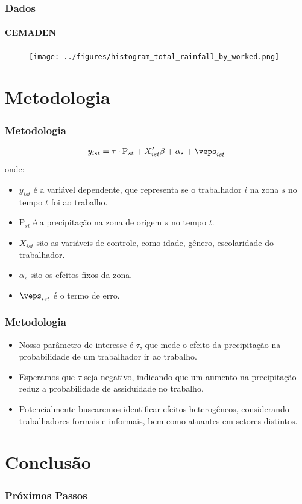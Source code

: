 \begin{frame}[plain]
    \frametitle{Dados}
    \framesubtitle{CEMADEN}
    \begin{figure}[H]
        \centering
        \texttt{[image: ../figures/histogram\_total\_rainfall\_by\_worked.png]}
        \label{fig:hist_total_rainfall_by_worked}
    \end{figure} 
\end{frame}


\section{Metodologia}
\begin{frame}[plain]
    \frametitle{Metodologia}
    \begin{align*}
    y_{ist} &= \tau \cdot \text{P}_{st} + X_{ist}'\beta + \alpha_{s} + \veps_{ist} \\ 
    \end{align*}
    onde:
    \begin{itemize}
        \item $y_{ist}$ é a variável dependente, que representa se o trabalhador $i$ na zona $s$ no tempo $t$ foi ao trabalho.
        \item $\text{P}_{st}$ é a precipitação na zona de origem $s$ no tempo $t$.
        \item $X_{ist}$ são as variáveis de controle, como idade, gênero, escolaridade do trabalhador.
        \item $\alpha_{s}$ são os efeitos fixos da zona.
        \item $\veps_{ist}$ é o termo de erro.
    \end{itemize}
\end{frame}

\begin{frame}
    \frametitle{Metodologia}
    \begin{itemize}
        \item Nosso parâmetro de interesse é $\tau$, que mede o efeito da precipitação na probabilidade de um trabalhador ir ao trabalho.
        \item Esperamos que $\tau$ seja negativo, indicando que um aumento na precipitação reduz a probabilidade de assiduidade no trabalho.
        \item Potencialmente buscaremos identificar efeitos heterogêneos, considerando trabalhadores formais e informais, bem como atuantes em setores distintos.
    \end{itemize}
\end{frame}

\section{Conclusão}
\begin{frame}[plain]
    \frametitle{Próximos Passos}
    \begin{itemize}
        
    \end{itemize}
\end{frame}